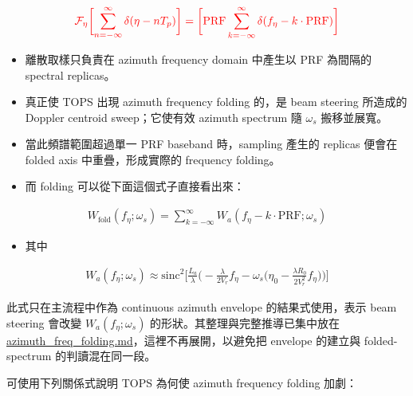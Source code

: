 \documentclass[11pt]{article}
\providecommand{\tightlist}{%
  \setlength{\itemsep}{0pt}\setlength{\parskip}{0pt}}
\begin{document}
\begin{equation}
\begin{aligned}
{\color{red}{\mathcal{F}_{\eta}\biggl[ \sum_{n=-\infty}^{\infty}\delta(\eta-nT_p) \biggr] = 
\biggl[ \mathrm{PRF}\sum_{k=-\infty}^{\infty}\delta(f_\eta-k\cdot\mathrm{PRF}) \biggr]}}
\end{aligned}
\end{equation}

\begin{itemize}
\item
  離散取樣只負責在 azimuth frequency domain 中產生以 PRF 為間隔的
  spectral replicas。
\item
  真正使 TOPS 出現 azimuth frequency folding 的，是 beam steering
  所造成的 Doppler centroid sweep；它使有效 azimuth spectrum 隨
  \(\omega_s\) 搬移並展寬。
\item
  當此頻譜範圍超過單一 PRF baseband 時，sampling 產生的 replicas 便會在
  folded axis 中重疊，形成實際的 frequency folding。
\item
  而 folding 可以從下面這個式子直接看出來：
\end{itemize}

\begin{equation}
\begin{aligned} W_{\mathrm{fold}}(f_\eta;\omega_s) = \sum_{k=-\infty}^{\infty} W_a(f_\eta-k\cdot\mathrm{PRF};\omega_s) \end{aligned}
\end{equation}

\begin{itemize}
\tightlist
\item
  其中
\end{itemize}

\begin{equation}
\begin{aligned}
W_a(f_\eta;\omega_s) \approx \mathrm{sinc}^2\biggl[ \frac{L_a}{\lambda}\biggl( -\frac{\lambda}{2V_r}f_\eta - \omega_s\biggl( \eta_0-\frac{\lambda R_0}{2V_r^2}f_\eta \biggr) \biggr) \biggr]
\end{aligned}
\end{equation}

此式只在主流程中作為 continuous azimuth envelope 的結果式使用，表示 beam
steering 會改變 \(W_a(f_\eta;\omega_s)\)
的形狀。其整理與完整推導已集中放在
\href{./azimuth_freq_folding.md}{azimuth\_freq\_folding.md}，這裡不再展開，以避免把
envelope 的建立與 folded-spectrum 的判讀混在同一段。

可使用下列關係式說明 TOPS 為何使 azimuth frequency folding 加劇：
\end{document}
